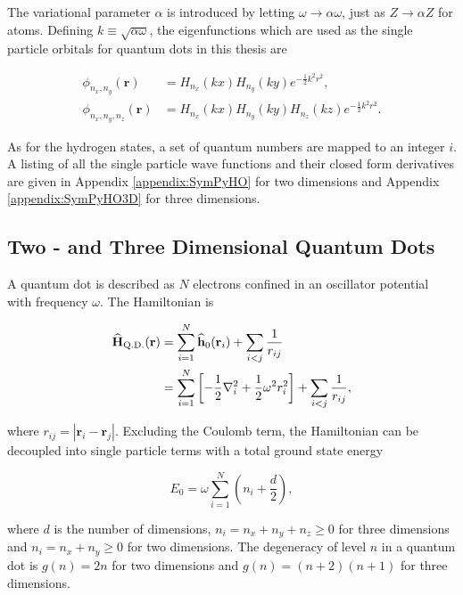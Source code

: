 The variational parameter $\alpha$ is introduced by letting $\omega\to\alpha\omega$, just as $Z\to\alpha Z$ for atoms. Defining $k\equiv\sqrt{\alpha\omega}$, the eigenfunctions which are used as the single particle orbitals for quantum dots in this thesis are

\begin{align}
\phi_{n_x, n_y}(\mathbf{r}) &= H_{n_x}(kx)H_{n_y}(ky)e^{-\frac{1}{2}k^2r^2}, \\
\phi_{n_x, n_y, n_z}(\mathbf{r}) &= H_{n_x}(kx)H_{n_y}(ky)H_{n_z}(kz)e^{-\frac{1}{2}k^2r^2}.
\end{align}

As for the hydrogen states, a set of quantum numbers are mapped to an integer $i$.  A listing of all the single particle wave functions and their closed form derivatives are given in Appendix \ref{appendix:SymPyHO} for two dimensions and Appendix \ref{appendix:SymPyHO3D} for three dimensions. 


\subsection{Two - and Three Dimensional Quantum Dots}

A quantum dot is described as $N$ electrons confined in an oscillator potential with frequency $\omega$. The Hamiltonian is

\begin{align}
 {\bf\widehat{H}}_{\mathrm{Q.D.}}(\mathbf{r}) &= \sum_{i=1}^N {\bf\widehat{h}}_0(\mathbf{r}_i) + \sum_{i<j} \frac{1}{r_{ij}} \\
                         &= \sum_{i=1}^N \left[-\frac{1}{2}\nabla_i^2 + \frac{1}{2}\omega^2r_i^2 \right] + \sum_{i<j} \frac{1}{r_{ij}},
\end{align}

where $r_{ij} = |\mathbf{r}_i -\mathbf{r}_j|$. Excluding the Coulomb term, the Hamiltonian can be decoupled into single particle terms with a total ground state energy \cite{griffiths}

\begin{equation}
 E_0 = \omega\sum_{i=1}^N \left(n_i + \frac{d}{2}\right), \label{eq:qdotsE0}
\end{equation}

where $d$ is the number of dimensions, $n_i = n_x + n_y + n_z \ge 0$ for three dimensions and $n_i = n_x + n_y \ge 0$ for two dimensions. The degeneracy of level $n$ in a quantum dot is $g(n) = 2n$ for two dimensions and $g(n) = (n+2)(n+1)$ for three dimensions.

